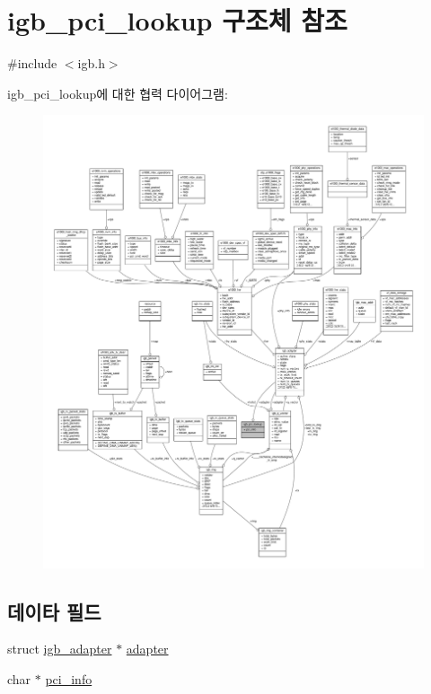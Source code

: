\hypertarget{structigb__pci__lookup}{}\section{igb\+\_\+pci\+\_\+lookup 구조체 참조}
\label{structigb__pci__lookup}


{\ttfamily \#include $<$igb.\+h$>$}



igb\+\_\+pci\+\_\+lookup에 대한 협력 다이어그램\+:
\nopagebreak
\begin{figure}[H]
\begin{center}
\leavevmode
\includegraphics[width=350pt]{structigb__pci__lookup__coll__graph}
\end{center}
\end{figure}
\subsection*{데이타 필드}
\begin{DoxyCompactItemize}
\item 
struct \hyperlink{structigb__adapter}{igb\+\_\+adapter} $\ast$ \hyperlink{structigb__pci__lookup_a194d1b705839346098846e03d7ae3108}{adapter}
\item 
char $\ast$ \hyperlink{structigb__pci__lookup_a34a8460a3c4d9c1fc36e0ae255db51df}{pci\+\_\+info}
\end{DoxyCompactItemize}


